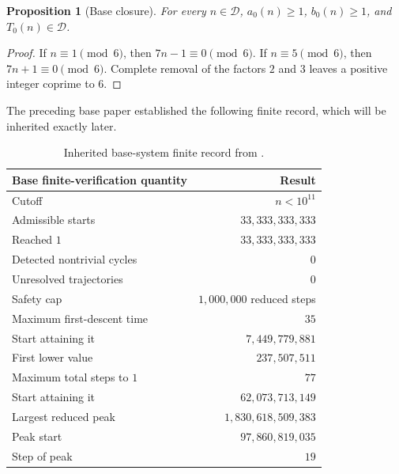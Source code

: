 \documentclass[11pt]{article}
\newtheorem{proposition}[theorem]{Proposition}
\begin{document}
\begin{proposition}[Base closure]
For every $n\in\mathcal D$, $a_0(n)\ge1$, $b_0(n)\ge1$, and $T_0(n)\in\mathcal D$.
\end{proposition}
\begin{proof}
If $n\equiv1\pmod6$, then $7n-1\equiv0\pmod6$. If $n\equiv5\pmod6$, then $7n+1\equiv0\pmod6$. Complete removal of the factors $2$ and $3$ leaves a positive integer coprime to $6$.
\end{proof}

The preceding base paper \cite{Base7Paper} established the following finite record, which will be inherited exactly later.
\begin{table}[ht]
\centering
\begin{tabular}{@{}lr@{}}
\toprule
Base finite-verification quantity & Result \\
\midrule
Cutoff & $n<10^{11}$ \\
Admissible starts & $33,333,333,333$ \\
Reached $1$ & $33,333,333,333$ \\
Detected nontrivial cycles & $0$ \\
Unresolved trajectories & $0$ \\
Safety cap & $1,000,000$ reduced steps \\
Maximum first-descent time & $35$ \\
Start attaining it & $7,449,779,881$ \\
First lower value & $237,507,511$ \\
Maximum total steps to $1$ & $77$ \\
Start attaining it & $62,073,713,149$ \\
Largest reduced peak & $1,830,618,509,383$ \\
Peak start & $97,860,819,035$ \\
Step of peak & $19$ \\
\bottomrule
\end{tabular}
\caption{Inherited base-system finite record from \cite{Base7Paper}.}
\label{tab:base-record}
\end{table}
\end{document}
